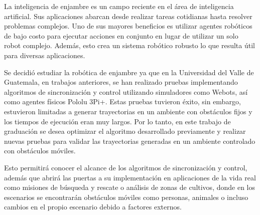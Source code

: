 La inteligencia de enjambre es un campo reciente en el área de inteligencia artificial. Sus aplicaciones abarcan desde realizar tareas cotidianas hasta resolver problemas complejos. Uno de sus mayores beneficios es utilizar agentes robóticos de bajo costo para ejecutar acciones en conjunto en lugar de utilizar un solo robot complejo. Además, esto crea un sistema robótico robusto lo que resulta útil para diversas aplicaciones.

Se decidió estudiar la robótica de enjambre ya que en la Universidad del Valle de Guatemala, en trabajos anteriores, se han realizado pruebas implementando algoritmos de sincronización y control utilizando simuladores como Webots, así como agentes físicos Pololu 3Pi+. Estas pruebas tuvieron éxito, sin embargo, estuvieron limitadas a generar trayectorias en un ambiente con obstáculos fijos y los tiempos de ejecución eran muy largos. Por lo tanto, en este trabajo de graduación se desea optimizar el algoritmo desarrollado previamente y realizar nuevas pruebas para validar las trayectorias generadas en un ambiente controlado con obstáculos móviles. 

Esto permitirá conocer el alcance de los algoritmos de sincronización y control, además que abrirá las puertas a su implementación en aplicaciones de la vida real como misiones de búsqueda y rescate o análisis de zonas de cultivos, donde en los escenarios se encontrarán obstáculos móviles como personas, animales o incluso cambios en el propio escenario debido a factores externos.





